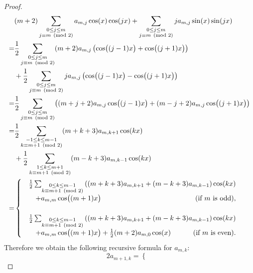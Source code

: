 \documentclass[a4paper,dvipdfmx]{amsart}
\theoremstyle{plain}
\theoremstyle{definition}
\theoremstyle{remark}
\numberwithin{equation}{section}
\begin{document}
\begin{proof}
\begin{equation}\label{eq:sin_cos}
\begin{split}
  &(m+2)
  \sum_{\substack{0\le j\le m\\ j\equiv m\pmod{2}}}a_{m,j}\cos(x)\cos(jx)
  +
  \sum_{\substack{0\le j\le m\\ j\equiv m\pmod{2}}}ja_{m,j}\sin(x)\sin(jx)
  \\
  =&
  \frac{1}{2}
  \sum_{\substack{0\le j\le m\\ j\equiv m\pmod{2}}}(m+2)a_{m,j}
  \left(\cos\bigl((j-1)x\bigr)+\cos\bigl((j+1)x\bigr)\right)
  \\
  &+
  \frac{1}{2}
  \sum_{\substack{0\le j\le m\\ j\equiv m\pmod{2}}}ja_{m,j}
  \left(\cos\bigl((j-1)x\bigr)-\cos\bigl((j+1)x\bigr)\right)
  \\
  =&
  \frac{1}{2}
  \sum_{\substack{0\le j\le m\\ j\equiv m\pmod{2}}}
  \bigl(
    (m+j+2)a_{m,j}\cos\bigl((j-1)x\bigr)
    +
    (m-j+2)a_{m,j}\cos\bigl((j+1)x\bigr)
  \bigr)
  \\
  =&
  \frac{1}{2}
  \sum_{\substack{-1\le k\le m-1\\ k\equiv m+1\pmod{2}}}(m+k+3)a_{m,k+1}\cos(kx)
  \\
  &+
  \frac{1}{2}
  \sum_{\substack{1\le k\le m+1\\ k\equiv m+1\pmod{2}}}(m-k+3)a_{m,k-1}\cos(kx)
  \\
  =&
  \begin{cases}
    &\frac{1}{2}
    \sum_{\substack{0\le k\le m-1\\ k\equiv m+1\pmod{2}}}
    \left((m+k+3)a_{m,k+1}+(m-k+3)a_{m,k-1}\right)\cos(kx)
    \\
    &\quad+
    a_{m,m}\cos\bigl((m+1)x\bigr)
    \hfill\text{(if $m$ is odd)},
    \\[5mm]
    &\frac{1}{2}
    \sum_{\substack{0\le k\le m-1\\ k\equiv m+1\pmod{2}}}
    \left((m+k+3)a_{m,k+1}+(m-k+3)a_{m,k-1}\right)\cos(kx)
    \\
    &\quad+
    a_{m,m}\cos\bigl((m+1)x\bigr)
    +
    \frac{1}{2}(m+2)a_{m,0}\cos(x)
    \hfill\text{(if $m$ is even)}.
  \end{cases}
\end{split}
\end{equation}
Therefore we obtain the following recursive formula for $a_{m,k}$:
\begin{equation*}
  2a_{m+1,k}
  =
  \begin{cases}

\end{cases}
\end{equation*}
\end{proof}
\end{document}
